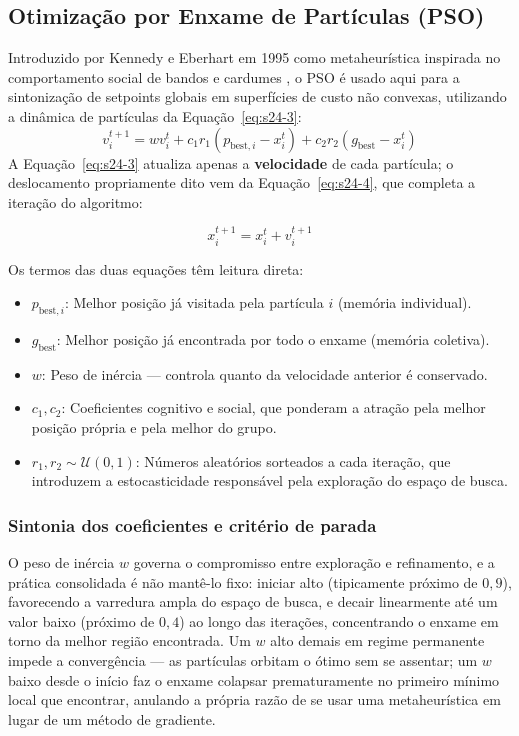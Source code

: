 \documentclass[12pt,a4paper]{article}
\numberwithin{equation}{section}
\numberwithin{table}{section}
\numberwithin{figure}{section}
\begin{document}
	\subsection{Otimização por Enxame de Partículas (PSO)}
	Introduzido por Kennedy e Eberhart em 1995 como metaheurística inspirada no comportamento social de bandos e cardumes \cite{pso}, o PSO é usado aqui para a sintonização de setpoints globais em superfícies de custo não convexas, utilizando a dinâmica de partículas da Equação~\eqref{eq:s24-3}:
	\begin{equation}\label{eq:s24-3}
 v_{i}^{t+1} = w v_{i}^t + c_1 r_1 (p_{\text{best},i} - x_{i}^t) + c_2 r_2 (g_{\text{best}} - x_{i}^t)
\end{equation}
	A Equação~\eqref{eq:s24-3} atualiza apenas a \textbf{velocidade} de cada partícula; o deslocamento propriamente dito vem da Equação~\eqref{eq:s24-4}, que completa a iteração do algoritmo:

	\begin{equation}\label{eq:s24-4}
	x_i^{t+1} = x_i^t + v_i^{t+1}
\end{equation}

	Os termos das duas equações têm leitura direta:
	\begin{itemize}
		\item $p_{\text{best},i}$: Melhor posição já visitada pela partícula $i$ (memória individual).
		\item $g_{\text{best}}$: Melhor posição já encontrada por todo o enxame (memória coletiva).
		\item $w$: Peso de inércia — controla quanto da velocidade anterior é conservado.
		\item $c_1, c_2$: Coeficientes cognitivo e social, que ponderam a atração pela melhor posição própria e pela melhor do grupo.
		\item $r_1, r_2 \sim \mathcal{U}(0,1)$: Números aleatórios sorteados a cada iteração, que introduzem a estocasticidade responsável pela exploração do espaço de busca.
	\end{itemize}

	\subsubsection*{Sintonia dos coeficientes e critério de parada}

	O peso de inércia $w$ governa o compromisso entre exploração e refinamento, e a prática consolidada é não mantê-lo fixo: iniciar alto (tipicamente próximo de $0{,}9$), favorecendo a varredura ampla do espaço de busca, e decair linearmente até um valor baixo (próximo de $0{,}4$) ao longo das iterações, concentrando o enxame em torno da melhor região encontrada. Um $w$ alto demais em regime permanente impede a convergência — as partículas orbitam o ótimo sem se assentar; um $w$ baixo desde o início faz o enxame colapsar prematuramente no primeiro mínimo local que encontrar, anulando a própria razão de se usar uma metaheurística em lugar de um método de gradiente.
\end{document}
